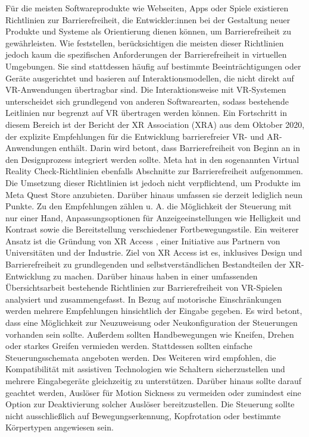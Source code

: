 Für die meisten Softwareprodukte wie Webseiten, Apps oder Spiele existieren Richtlinien zur Barrierefreiheit, die Entwickler:innen bei der Gestaltung neuer Produkte und Systeme als Orientierung dienen können, um Barrierefreiheit zu gewährleisten. Wie \citet{heilemann_accessibility_2021} feststellen, berücksichtigen die meisten dieser Richtlinien jedoch kaum die spezifischen Anforderungen der Barrierefreiheit in virtuellen Umgebungen. Sie sind stattdessen häufig auf bestimmte Beeinträchtigungen oder Geräte ausgerichtet und basieren auf Interaktionsmodellen, die nicht direkt auf VR-Anwendungen übertragbar sind. Die Interaktionsweise mit VR-Systemen unterscheidet sich grundlegend von anderen Softwarearten, sodass bestehende Leitlinien nur begrenzt auf VR übertragen werden können. Ein Fortschritt in diesem Bereich ist der Bericht der XR Association (XRA) aus dem Oktober 2020, der explizite Empfehlungen für die Entwicklung barrierefreier VR- und AR-Anwendungen enthält. Darin wird betont, dass Barrierefreiheit von Beginn an in den Designprozess integriert werden sollte. Meta hat in den sogenannten Virtual Reality Check-Richtlinien \citep{meta-vrc} ebenfalls Abschnitte zur Barrierefreiheit aufgenommen. Die Umsetzung dieser Richtlinien ist jedoch nicht verpflichtend, um Produkte im Meta Quest Store anzubieten. Darüber hinaus umfassen sie derzeit lediglich neun Punkte. Zu den Empfehlungen zählen u. A. die Möglichkeit der Steuerung mit nur einer Hand, Anpassungsoptionen für Anzeigeeinstellungen wie Helligkeit und Kontrast sowie die Bereitstellung verschiedener Fortbewegungsstile. Ein weiterer Ansatz ist die Gründung von XR Access \citep{xr_access}, einer Initiative aus Partnern von Universitäten und der Industrie. Ziel von XR Access ist es, inklusives Design und Barrierefreiheit zu grundlegenden und selbstverständlichen Bestandteilen der XR-Entwicklung zu machen. Darüber hinaus haben \citet{heilemann_accessibility_2021} in einer umfassenden Übersichtsarbeit bestehende Richtlinien zur Barrierefreiheit von VR-Spielen analysiert und zusammengefasst. In Bezug auf motorische Einschränkungen werden mehrere Empfehlungen hinsichtlich der Eingabe gegeben. Es wird betont, dass eine Möglichkeit zur Neuzuweisung oder Neukonfiguration der Steuerungen vorhanden sein sollte. Außerdem sollten Handbewegungen wie Kneifen, Drehen oder starkes Greifen vermieden werden. Stattdessen sollten einfache Steuerungsschemata angeboten werden. Des Weiteren wird empfohlen, die Kompatibilität mit assistiven Technologien wie Schaltern sicherzustellen und mehrere Eingabegeräte gleichzeitig zu unterstützen. Darüber hinaus sollte darauf geachtet werden, Auslöser für Motion Sickness zu vermeiden oder zumindest eine Option zur Deaktivierung solcher Auslöser bereitzustellen. Die Steuerung sollte nicht ausschließlich auf Bewegungserkennung, Kopfrotation oder bestimmte Körpertypen angewiesen sein.

